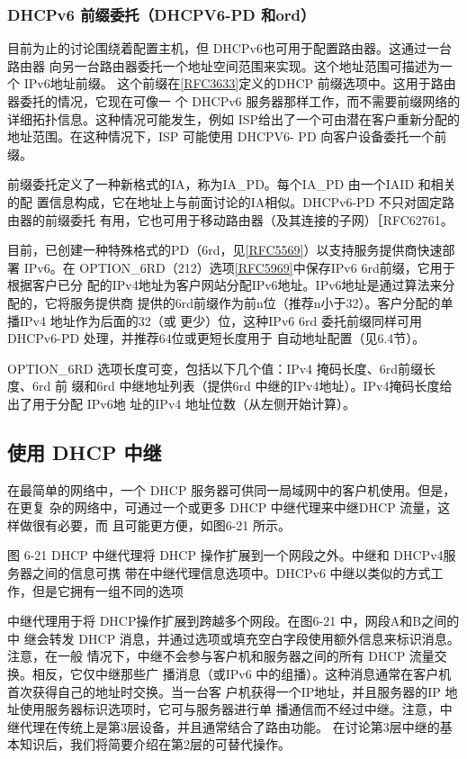 \subsubsection{DHCPv6 前缀委托（DHCPV6-PD 和ord）}
目前为止的讨论围绕着配置主机，但 DHCPv6也可用于配置路由器。这通过一台路由器
向另一台路由器委托一个地址空间范围来实现。这个地址范围可描述为一个 IPv6地址前缀。
这个前缀在\href{https://www.rfc-editor.org/rfc/rfc3633}{\href{https://www.rfc-editor.org/rfc/rfc3633}{[RFC3633]}}定义的DHCP 前缀选项中。这用于路由器委托的情况，它现在可像一
个 DHCPv6 服务器那样工作，而不需要前缀网络的详细拓扑信息。这种情况可能发生，例如
ISP给出了一个可由潜在客户重新分配的地址范围。在这种情况下，ISP 可能使用 DHCPV6-
PD 向客户设备委托一个前缀。

前缀委托定义了一种新格式的IA，称为IA\_PD。每个IA\_PD 由一个IAID 和相关的配
置信息构成，它在地址上与前面讨论的IA相似。DHCPv6-PD 不只对固定路由器的前缀委托
有用，它也可用于移动路由器（及其连接的子网）［RFC62761。

目前，已创建一种特殊格式的PD（6rd，见\href{https://www.rfc-editor.org/rfc/rfc5569}{\href{https://www.rfc-editor.org/rfc/rfc5569}{[RFC5569]}}）以支持服务提供商快速部署
IPv6。在 OPTION\_6RD（212）选项\href{https://www.rfc-editor.org/rfc/rfc5969}{\href{https://www.rfc-editor.org/rfc/rfc5969}{[RFC5969]}}中保存IPv6 6rd前缀，它用于根据客户已分
配的IPv4地址为客户网站分配IPv6地址。IPv6地址是通过算法来分配的，它将服务提供商
提供的6rd前缀作为前n位（推荐n小于32）。客户分配的单播IPv4 地址作为后面的32（或
更少）位，这种IPv6 6rd 委托前缀同样可用DHCPv6-PD 处理，并推荐64位或更短长度用于
自动地址配置（见6.4节）。

OPTION\_6RD 选项长度可变，包括以下几个值：IPv4 掩码长度、6rd前缀长度、6rd 前
缀和6rd 中继地址列表（提供6rd 中继的IPv4地址）。IPv4掩码长度给出了用于分配 IPv6地
址的IPv4 地址位数（从左侧开始计算）。

\subsection{使用 DHCP 中继}
在最简单的网络中，一个 DHCP 服务器可供同一局域网中的客户机使用。但是，在更复
杂的网络中，可通过一个或更多 DHCP 中继代理来中继DHCP 流量，这样做很有必要，而
且可能更方便，如图6-21 所示。

图 6-21
DHCP 中继代理将 DHCP 操作扩展到一个网段之外。中继和 DHCPv4服务器之间的信息可携
带在中继代理信息选项中。DHCPv6 中继以类似的方式工作，但是它拥有一组不同的选项

中继代理用于将 DHCP操作扩展到跨越多个网段。在图6-21 中，网段A和B之间的中
继会转发 DHCP 消息，并通过选项或填充空白字段使用额外信息来标识消息。注意，在一般
情况下，中继不会参与客户机和服务器之间的所有 DHCP 流量交换。相反，它仅中继那些广
播消息（或IPv6 中的组播）。这种消息通常在客户机首次获得自己的地址时交换。当一台客
户机获得一个IP地址，并且服务器的IP 地址使用服务器标识选项时，它可与服务器进行单
播通信而不经过中继。注意，中继代理在传统上是第3层设备，并且通常结合了路由功能。
在讨论第3层中继的基本知识后，我们将简要介绍在第2层的可替代操作。

